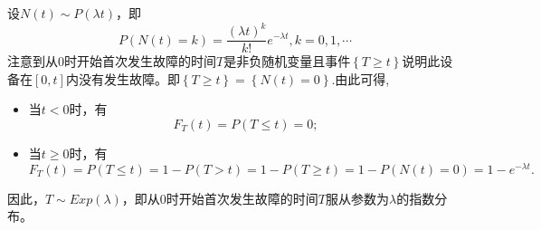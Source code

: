 \begin{solution}
    设$N(t)\sim P(\lambda t)$，即$$P(N(t)=k)=\frac{(\lambda t)^{k} }{k!} e^{-\lambda t} ,k=0,1,\cdots $$
    注意到从$0$时开始首次发生故障的时间$T$是非负随机变量且事件$\left \{ T\geq t \right \} $说明此设备在$\left [ 0,t \right ]$内没有发生故障。即$\left \{ T\geq t \right \} =\left \{ N(t)=0 \right \} .$由此可得,
    \begin{itemize}
    \item 当$t<0$时，有$$F_{T} (t)=P(T\le t)=0;$$
    \item  当$t\geq 0$时，有$$F_{T} (t)=P(T\le t)=1-P(T> t) = 1-P(T\geq t)=1-P(N(t)=0)=1-e^{-\lambda t} .$$
    \end{itemize}
    因此，$T\sim {Exp}(\lambda)$，即从$0$时开始首次发生故障的时间$T$服从参数为$\lambda$的指数分布。
\end{solution}

